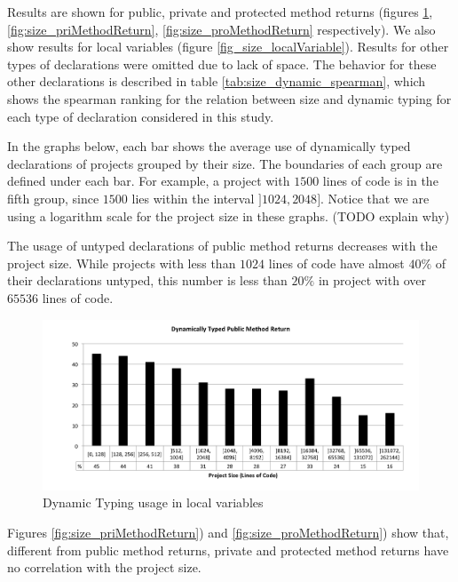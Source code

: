\documentclass[preprint]{sigplanconf}
\begin{document}
Results are shown for public, private and protected method returns (figures \ref{fig:size_pubMethodReturn}, \ref{fig:size_priMethodReturn}, \ref{fig:size_proMethodReturn} respectively). 
We also show results for local variables (figure \ref{fig_size_localVariable}). 
Results for other types of declarations were omitted due to lack of space.
The behavior for these other declarations is described in table \ref{tab:size_dynamic_spearman}, which shows the spearman ranking for the relation between size and dynamic typing for each type of declaration considered in this study.

In the graphs below, each bar shows the average use of dynamically typed declarations of projects grouped by their size.
The boundaries of each group are defined under each bar.
For example, a project with $1500$ lines of code is in the fifth group, since $1500$ lies within the interval $]1024, 2048]$.
Notice that we are using a logarithm scale for the project size in these graphs. (TODO explain why)

The usage of untyped declarations of public method returns decreases with the project size.
While projects with less than $1024$ lines of code have almost $40\%$ of their declarations untyped, this number is less than $20\%$ in project with over $65536$ lines of code.

\begin{figure}[ht]
\centering 
\includegraphics[width=1\textwidth]{size_pubMethodReturn} 
\caption{Dynamic Typing usage in local variables}
\label{fig:size_pubMethodReturn} 
\end{figure}

Figures \ref{fig:size_priMethodReturn}) and \ref{fig:size_proMethodReturn}) show that, different from public method returns, private and protected method returns have no correlation with the project size.
\end{document}
